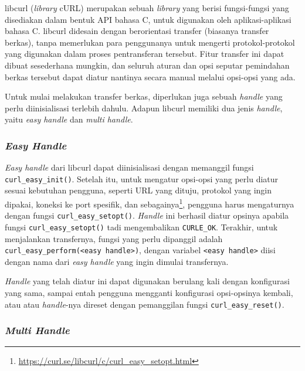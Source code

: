 libcurl (\textit{library} cURL) merupakan sebuah \textit{library} yang berisi fungsi-fungsi yang disediakan dalam bentuk API bahasa C, untuk digunakan oleh aplikasi-aplikasi bahasa C. libcurl didesain dengan berorientasi transfer (biasanya transfer berkas), tanpa memerlukan para penggunanya untuk mengerti protokol-protokol yang digunakan dalam proses pentransferan tersebut. Fitur transfer ini dapat dibuat sesederhana mungkin, dan seluruh aturan dan opsi seputar pemindahan berkas tersebut dapat diatur nantinya secara manual melalui opsi-opsi yang ada.

Untuk mulai melakukan transfer berkas, diperlukan juga sebuah \textit{handle} yang perlu diinisialisasi terlebih dahulu. Adapun libcurl memiliki dua jenis \textit{handle}, yaitu \textit{easy handle} dan \textit{multi handle}. 
\vspace{-0.2em} %
\subsubsection{\textit{Easy Handle}}
\label{sec:cmodules-libcurl-handleeasy}

\textit{Easy handle} dari libcurl dapat diinisialisasi dengan memanggil fungsi \verb|curl_easy_init()|. Setelah itu, untuk mengatur opsi-opsi yang perlu diatur sesuai kebutuhan pengguna, seperti URL yang dituju, protokol yang ingin dipakai, koneksi ke port spesifik, dan sebagainya\footnote{\href{https://curl.se/libcurl/c/curl\_easy\_setopt.html}{https://curl.se/libcurl/c/curl\_easy\_setopt.html}}, pengguna harus mengaturnya dengan fungsi \verb|curl_easy_setopt()|. \textit{Handle} ini berhasil diatur opsinya apabila fungsi \verb|curl_easy_setopt()| tadi mengembalikan \verb|CURLE_OK|. Terakhir, untuk menjalankan transfernya, fungsi yang perlu dipanggil adalah \verb|curl_easy_perform(<easy handle>)|, dengan variabel \verb|<easy handle>| diisi dengan nama dari \textit{easy handle} yang ingin dimulai transfernya.

\textit{Handle} yang telah diatur ini dapat digunakan berulang kali dengan konfigurasi yang sama, sampai entah pengguna mengganti konfigurasi opsi-opsinya kembali, atau atau \textit{handle}-nya direset dengan pemanggilan fungsi \verb|curl_easy_reset()|.
\vspace{-0.2em} %
\subsubsection{\textit{Multi Handle}}
\label{sec:cmodules-libcurl-handlemulti}

